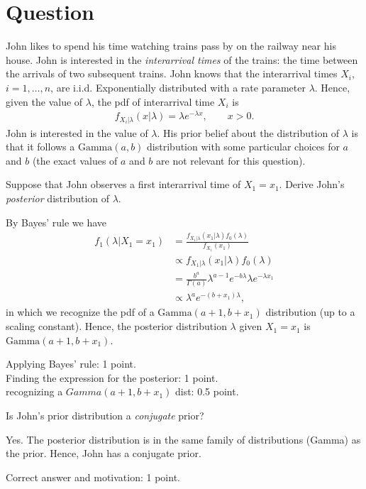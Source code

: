 \section{Question}


John likes to spend his time watching trains pass by on the railway near his house. John is interested in the \textit{interarrival times} of the trains: the time between the arrivals of two subsequent trains. John knows that the interarrival times $X_i$, $i=1,\ldots,n$, are i.i.d. Exponentially distributed with a rate parameter $\lambda$. Hence, given the value of $\lambda$, the pdf of interarrival time $X_i$ is
\begin{align}
    f_{X_i|\lambda}(x|\lambda) = \lambda e^{-\lambda x}, \qquad x > 0.
\end{align}
John is interested in the value of $\lambda$. His prior belief about the distribution of $\lambda$ is that it follows a $\text{Gamma}(a,b)$ distribution with some particular choices for $a$ and $b$ (the exact values of $a$ and $b$ are not relevant for this question).

\begin{exercise}[2.5]
Suppose that John observes a first interarrival time of $X_1 = x_1$. Derive John's \textit{posterior} distribution of $\lambda$.
\begin{solution}
By Bayes' rule we have
\begin{align}
    f_1(\lambda|X_1 = x_1) &= \frac{f_{X_1|\lambda}(x_1|\lambda) f_0(\lambda)}{f_{X_1}(x_1)} \\
    &\propto f_{X_1|\lambda}(x_1|\lambda) f_0(\lambda) \\
    &= \frac{b^a}{\Gamma(a)}\lambda^{a-1} e^{-b\lambda} \lambda e^{-\lambda x_1} \\
    &\propto \lambda^{a} e^{-(b + x_1)\lambda},
\end{align}
in which we recognize the pdf of a $\text{Gamma}(a+1,b+x_1)$ distribution (up to a scaling constant). Hence, the posterior distribution $\lambda$ given $X_1 = x_1$ is $\text{Gamma}(a+1,b+x_1)$.

Applying Bayes' rule: 1 point.\\
Finding the expression for the posterior: 1 point.\\
recognizing a $Gamma(a+1,b+x_1)$ dist: 0.5 point.
\end{solution}
\end{exercise}

\begin{exercise}[1]
Is John's prior distribution a \textit{conjugate} prior?
\begin{solution}
Yes. The posterior distribution is in the same family of distributions  (Gamma) as the prior. Hence, John has a conjugate prior.

Correct answer and motivation: 1 point.
\end{solution}
\end{exercise}

